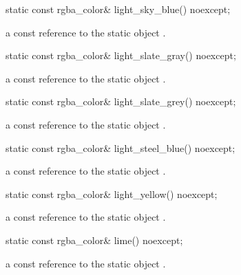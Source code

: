 \begin{itemdecl}
static const rgba_color& light_sky_blue() noexcept;
\end{itemdecl}
\begin{itemdescr}
\pnum
\returns
a const reference to the static  object .
\end{itemdescr}

\begin{itemdecl}
static const rgba_color& light_slate_gray() noexcept;
\end{itemdecl}
\begin{itemdescr}
\pnum
\returns
a const reference to the static  object .
\end{itemdescr}

\begin{itemdecl}
static const rgba_color& light_slate_grey() noexcept;
\end{itemdecl}
\begin{itemdescr}
\pnum
\returns
a const reference to the static  object .
\end{itemdescr}

\begin{itemdecl}
static const rgba_color& light_steel_blue() noexcept;
\end{itemdecl}
\begin{itemdescr}
\pnum
\returns
a const reference to the static  object .
\end{itemdescr}

\begin{itemdecl}
static const rgba_color& light_yellow() noexcept;
\end{itemdecl}
\begin{itemdescr}
\pnum
\returns
a const reference to the static  object .
\end{itemdescr}

\begin{itemdecl}
static const rgba_color& lime() noexcept;
\end{itemdecl}
\begin{itemdescr}
\pnum
\returns
a const reference to the static  object .
\end{itemdescr}

